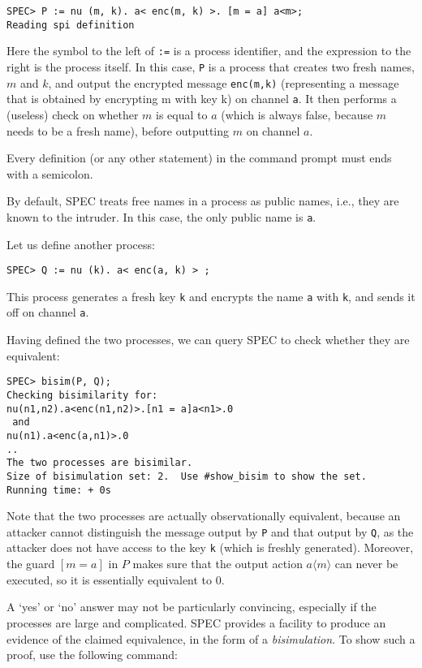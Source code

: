\documentclass{article}
\begin{document}
\begin{verbatim}
SPEC> P := nu (m, k). a< enc(m, k) >. [m = a] a<m>;
Reading spi definition
\end{verbatim}
Here the symbol to the left of \texttt{:=} is a process identifier, and 
the expression to the right is the process itself. In this case, \texttt{P}
is a process that creates two fresh names, $m$ and $k$, and output 
the encrypted message \texttt{enc(m,k)} (representing a message that is obtained
by encrypting m with key k) on channel \texttt{a}. It then performs
a (useless) check on whether $m$ is equal to $a$ (which is always false, because
$m$ needs to be a fresh name), before outputting $m$ on channel $a$. 

Every definition (or any other statement) in the command prompt must ends with a
semicolon. 

By default, SPEC treats free names in a process as public names, i.e., they are known
to the intruder. In this case, the only public name is \texttt{a}. 

Let us define another process:

\begin{verbatim}
SPEC> Q := nu (k). a< enc(a, k) > ;
\end{verbatim}
This process generates a fresh key \texttt{k} and encrypts the name \texttt{a}
with \texttt{k}, and sends it off on channel \texttt{a}. 

Having defined the two processes, we can query SPEC to check whether they are
equivalent:

\begin{verbatim}
SPEC> bisim(P, Q);
Checking bisimilarity for: 
nu(n1,n2).a<enc(n1,n2)>.[n1 = a]a<n1>.0
 and 
nu(n1).a<enc(a,n1)>.0
..
The two processes are bisimilar.
Size of bisimulation set: 2.  Use #show_bisim to show the set.
Running time: + 0s
\end{verbatim}

Note that the two processes are actually observationally equivalent, because
an attacker cannot distinguish the message output by \texttt{P} and
that output by \texttt{Q}, as the attacker does not have access to the
key \texttt{k} (which is freshly generated). Moreover, the guard $[m = a]$ in
$P$ makes sure that the output action $a\langle m \rangle$ can never
be executed, so it is essentially equivalent to $0$.

A `yes' or `no' answer may not be particularly convincing, especially if the processes are
large and complicated. SPEC provides a facility to produce an evidence of the
claimed equivalence, in the form of a {\em bisimulation}. To show such a 
proof, use the following command:
\end{document}
